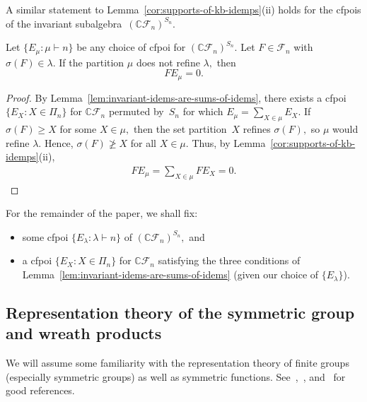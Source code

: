 \documentclass[ALCO, Unicode]{cedram}
\def\C{{\mathbb{C}}}
\begin{document}
A similar statement to Lemma~\ref{cor:supports-of-kb-idemps}(ii) holds for the cfpois of the invariant subalgebra~$\left(\C \mathcal{F}_n \right)^{S_n}$.
\begin{lemma} \label{lem:invariant-saliola-lemma}
   Let $\{E_\mu: \mu \vdash n\}$ be any choice of cfpoi for $\left (\C \mathcal{F}_n \right)^{S_n}.$ Let $F \in \mathcal{F}_n$ with $\sigma(F) \in \lambda.$ If the partition $\mu$ does not refine $\lambda,$ then 
   \[F E_\mu = 0.\]
\end{lemma}
\begin{proof}
    By Lemma~\ref{lem:invariant-idems-are-sums-of-idems}, there exists a cfpoi $\{E_X: X \in \Pi_n\}$ for $\C \mathcal{F}_n$ permuted by~$S_n$ for which $E_\mu = \sum_{X \in \mu} E_X.$ If $\sigma(F) \geq X$ for some $X \in \mu,$ then the set partition~$X$ refines $\sigma(F),$ so $\mu$ would refine $\lambda.$ Hence, $\sigma(F) \ngeq X$ for all $X \in \mu.$ Thus, by Lemma~\ref{cor:supports-of-kb-idemps}(ii), 
    \begin{align*}
        F E_\mu = \sum_{X \in \mu}F E_X = 0.
    \end{align*}
\end{proof}

For the remainder of the paper, we shall fix:
\begin{itemize}
    \item some cfpoi $\{E_\lambda: \lambda \vdash n\}$ of $\left(\C \mathcal{F}_n\right)^{S_n},$ and
    \item a cfpoi $\{E_X: X \in \Pi_n\}$ for $\C \mathcal{F}_n$ satisfying the three conditions of Lemma~\ref{lem:invariant-idems-are-sums-of-idems} (given our choice of $\{E_\lambda\}$).
\end{itemize}

\subsection{Representation theory of the symmetric group and wreath products}

We will assume some familiarity with the representation theory of finite groups (especially symmetric groups) as well as symmetric functions. See~\cite{sagan2013symmetric},~\cite[Ch. 7]{ec2}, and~\cite{Alexandersson2020} for good references. 
\end{document}
